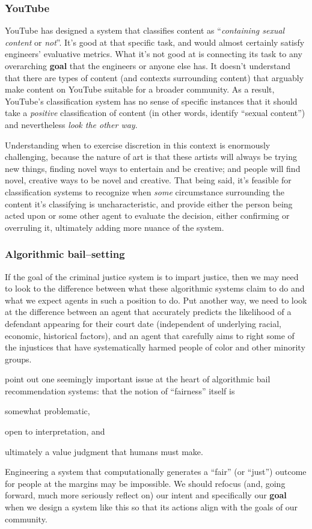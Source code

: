 \documentclass[main]{subfiles}
\begin{document}
\subsubsection{YouTube}
YouTube has designed a system that classifies content as ``\textit{containing sexual content} or \textit{not}''.
It's good at that specific task, and would almost certainly satisfy engineers' evaluative metrics.
What it's not good at is connecting its task to any overarching \textbf{goal} that the engineers or anyone else has.
It doesn't understand that there are types of content
(and contexts surrounding content) that arguably make content on YouTube suitable for a broader community.
As a result,
YouTube's classification system has no sense of specific instances that it should take
a \textit{positive} classification of content (in other words, identify ``sexual content'')
and nevertheless \textit{look the other way}.

Understanding when to exercise discretion in this context is enormously challenging, because
the nature of art is that
these artists will always be trying new things, finding novel ways to entertain and be creative;
and people will find novel, creative ways to be novel and creative.
That being said, it's feasible for classification systems to recognize when
\textit{some} circumstance surrounding the content it's classifying is uncharacteristic, and
provide either the person being acted upon or some other agent to evaluate the decision,
either confirming or overruling it,
ultimately adding more nuance of the system.

\subsubsection{Algorithmic bail--setting}
If the goal of the criminal justice system is to impart justice,
then we may need to look to the difference between
what these algorithmic systems claim to do and
what we expect agents in such a position to do.
Put another way, we need to look at the difference between
an agent that accurately predicts the likelihood of a defendant appearing for their court date
(independent of underlying racial, economic, historical factors),
and an agent that carefully aims
to right some of the injustices that have systematically harmed
people of color and other minority groups.

\citeauthor{corbett2018measure} point out one seemingly important issue
at the heart of algorithmic bail recommendation systems:
that the notion of ``fairness'' itself is
\begin{enumerate*}
  \item somewhat problematic,
  \item open to interpretation, and
  \item ultimately a value judgment that humans must make.
\end{enumerate*}
Engineering a system that computationally generates a ``fair'' (or ``just'') outcome
for people at the margins
may be impossible.
We should refocus
(and, going forward, much more seriously reflect on)
our intent and specifically our \textbf{goal} when we design a system like this
so that its actions align with the goals of our community.
\end{document}
